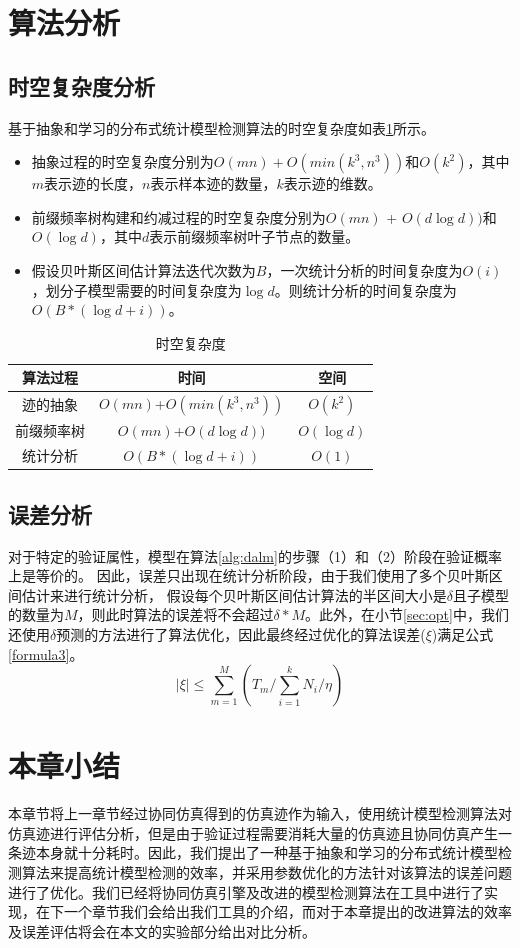 \section{算法分析}
\subsection{时空复杂度分析}
基于抽象和学习的分布式统计模型检测算法的时空复杂度如表\ref{tb:complexity}所示。
\begin{itemize}
\item
抽象过程的时空复杂度分别为$O(mn)+O(min(k^3,n^3))$和$O(k^2)$，其中 $m$表示迹的长度，$n$表示样本迹的数量，$k$表示迹的维数。 
\item
前缀频率树构建和约减过程的时空复杂度分别为$O(mn)$ + $O(d\log{d}))$和$O(\log{d})$，其中$d$表示前缀频率树叶子节点的数量。
\item
假设贝叶斯区间估计算法迭代次数为$B$，一次统计分析的时间复杂度为$O(i)$，划分子模型需要的时间复杂度为$\log{d}$。则统计分析的时间复杂度为$O(B*(\log{d}+i))$。
\end{itemize}

\begin{table}[t]
	\caption{时空复杂度}
	\label{tb:complexity}
	\centering
	\begin{tabular}{c c c}
	    \hline
		算法过程 & 时间  & 空间 \\
		\hline
		迹的抽象 & $O(mn)$+$O(min(k^3,n^3))$ & $O(k^2)$ \\ 
		\hline
		前缀频率树 &$O(mn)$+$O(d\log{d}))$ & $O(\log{d})$ \\
		\hline
		统计分析 & $O(B*(\log{d}+i))$ & $O(1)$\\	
		\hline
	\end{tabular}
\end{table}

\subsection{误差分析}
对于特定的验证属性，模型在算法\ref{alg:dalm}的步骤（1）和（2）阶段在验证概率上是等价的。 因此，误差只出现在统计分析阶段，由于我们使用了多个贝叶斯区间估计来进行统计分析， 假设每个贝叶斯区间估计算法的半区间大小是$\delta$且子模型的数量为$M$，则此时算法的误差将不会超过$\delta*M$。此外，在小节\ref{sec:opt}中，我们还使用$\delta$预测的方法进行了算法优化，因此最终经过优化的算法误差($\xi$)满足公式\ref{formula3}。
\begin{equation}
\label{formula3}
| \xi | \leq \sum\limits_{m=1}^M (T_m / \sum\limits_{i=1}^k N_i / \eta)
\end{equation}
\section{本章小结}
本章节将上一章节经过协同仿真得到的仿真迹作为输入，使用统计模型检测算法对仿真迹进行评估分析，但是由于验证过程需要消耗大量的仿真迹且协同仿真产生一条迹本身就十分耗时。因此，我们提出了一种基于抽象和学习的分布式统计模型检测算法来提高统计模型检测的效率，并采用参数优化的方法针对该算法的误差问题进行了优化。我们已经将协同仿真引擎及改进的模型检测算法在工具中进行了实现，在下一个章节我们会给出我们工具的介绍，而对于本章提出的改进算法的效率及误差评估将会在本文的实验部分给出对比分析。